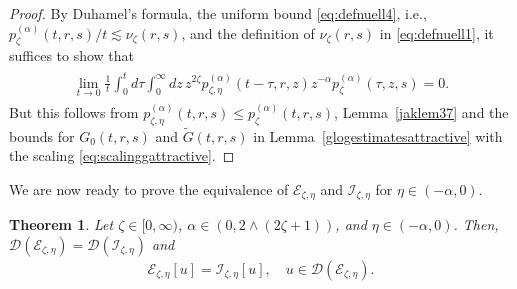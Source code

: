 \documentclass[12pt,reqno]{amsart}
\newtheorem{theorem}{Theorem}[section]
\theoremstyle{definition}
\theoremstyle{remark}
\numberwithin{equation}{section}
\newcommand{\1}{\mathbbm{1}}
\newcommand{\D}{\mathcal{D}}
\def\ce{\mathcal{E}}
\def\ci{\mathcal{I}}
\begin{document}
\begin{proof}
  By Duhamel's formula, the uniform bound \eqref{eq:defnuell4}, i.e., $p_\zeta^{(\alpha)}(t,r,s)/t\lesssim\nu_\zeta(r,s)$, and the definition of $\nu_\zeta(r,s)$ in \eqref{eq:defnuell1}, it suffices to show that
  \begin{align}
    \begin{split}
      \lim_{t\to0}\frac1t \int_0^t d\tau \int_0^\infty dz\, z^{2\zeta} p_{\zeta,\eta}^{(\alpha)}(t-\tau,r,z)z^{-\alpha}p_\zeta^{(\alpha)}(\tau,z,s) = 0.
    \end{split}
  \end{align}
  But this follows from $p_{\zeta,\eta}^{(\alpha)}(t,r,s)\leq p_\zeta^{(\alpha)}(t,r,s)$, Lemma~\ref{jaklem37} and the bounds for $G_0(t,r,s)$ and $\tilde G(t,r,s)$ in Lemma~\ref{glogestimatesattractive} with the scaling \eqref{eq:scalinggattractive}.
\end{proof}

We are now ready to prove the equivalence of $\ce_{\zeta,\eta}$ and $\ci_{\zeta,\eta}$ for $\eta\in(-\alpha,0)$.

\begin{theorem}
  \label{jakprop318}
  Let $\zeta\in[0,\infty)$, $\alpha\in(0,2\wedge(2\zeta+1))$, and $\eta\in(-\alpha,0)$.
  Then, $\D(\ce_{\zeta,\eta})=\D(\ci_{\zeta,\eta})$ and
  \begin{align}
    \ce_{\zeta,\eta}[u] = \ci_{\zeta,\eta}[u],\quad u\in\D(\ce_{\zeta,\eta}).
  \end{align}
\end{theorem}
\end{document}
